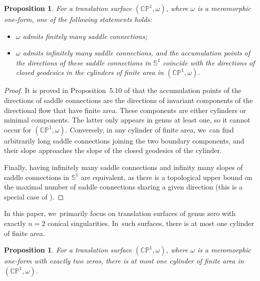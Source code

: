 \documentclass[11pt]{article}
\newtheorem{prop}[thm]{Proposition}
\theoremstyle{definition}
\begin{document}
\begin{prop}\label{prop:INFINITE-SC-Chara}
For a translation surface $(\mathbb{CP}^{1},\omega)$, where $\omega$ is a meromorphic one-form, one of the following statements holds:
\begin{itemize}
\item $\omega$ admits finitely many saddle connections;
\item $\omega$ admits infinitely many saddle connections, and the accumulation points of the directions of these saddle connections in $\mathbb{S}^{1}$ coincide with the directions of closed geodesics in the cylinders of finite area in $(\mathbb{CP}^{1},\omega)$.
\end{itemize}
\end{prop}

\begin{proof}
It is proved in Proposition~5.10 of \cite{tahar} that the accumulation points of the directions of saddle connections are the directions of invariant components of the directional flow that have finite area. These components are either cylinders or minimal components. The latter only appears in genus at least one, so it cannot occur for $(\mathbb{CP}^{1},\omega)$. Conversely, in any cylinder of finite area, we~can find arbitrarily long saddle connections joining the two boundary components, and their slope approaches the slope of the closed geodesics of the cylinder.

Finally, having infinitely many saddle connections and infinity many slopes of saddle connections in $\mathbb{S}^{1}$ are equivalent, as there is a topological upper bound on the maximal number of saddle connections sharing a given direction (this is a special case of \cite[Prop.\,7.6]{tahar}).
\end{proof}

In this paper, we~primarily focus on translation surfaces of genus zero with exactly $n=2$ conical singularities. In~such surfaces, there is at most one cylinder of finite area.

\begin{prop}
For a translation surface $(\mathbb{CP}^{1},\omega)$, where $\omega$ is a meromorphic one-form with exactly two zeros, there is at most one cylinder of finite area in $(\mathbb{CP}^{1},\omega)$.
\end{prop}
\end{document}
